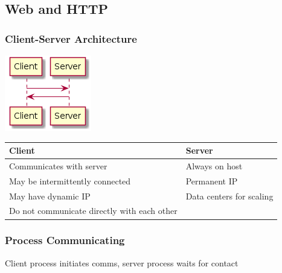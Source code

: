\documentclass[11pt]{article}
\begin{document}
\subsection{Web and HTTP}
\label{sec:orgc616d98}
\subsubsection{Client-Server Architecture}
\label{sec:org2af8313}

\begin{center}
\includegraphics[width=.9\linewidth]{clientserver.png}
\end{center}

\begin{center}
\begin{tabular}{ll}
\textbf{Client} & \textbf{Server}\\
\hline
Communicates with server & Always on host\\
\hline
May be intermittently connected & Permanent IP\\
\hline
May have dynamic IP & Data centers for scaling\\
\hline
Do not communicate directly with each other & \\
\end{tabular}
\end{center}

\subsubsection{Process Communicating}
\label{sec:org2559eee}
Client process initiates comms, server process waits for contact
\end{document}
